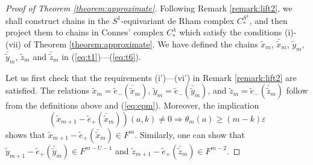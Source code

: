 \documentclass[a4paper]{article}
\numberwithin{equation}{section}
\begin{document}
\begin{proof}[Proof of Theorem \ref{theorem:approximate}]
Following Remark \ref{remark:lift2}, we shall construct chains in the $S^1$-equivariant de Rham complex $C_\ast^{S^1}$, and then project them to chains in Connes' complex $C_\ast^\lambda$ which satisfy the conditions (i)-(vii) of Theorem \ref{theorem:approximate}. We have defined the chains $\tilde{x}_m$, $\bar{\tilde{x}}_m$, $\tilde{y}_m$, $\bar{\tilde{y}}_m$, $\tilde{z}_m$ and $\bar{\tilde{z}}_m$ in (\ref{eq:t1})---(\ref{eq:t6}). 

Let us first check that the requirements (i')---(vi') in Remark \ref{remark:lift2} are satisfied. The relations $\tilde{x}_m=\tilde{e}_-(\bar{\tilde{x}}_m)$, $\tilde{y}_m=\tilde{e}_-(\bar{\tilde{y}}_m)$, and $\tilde{z}_m=\tilde{e}_-(\bar{\tilde{z}}_m)$ follow from the definitions above and (\ref{eq:epm}). Moreover, the implication
\begin{equation}
\left(\tilde{x}_{m+1}-\tilde{e}_+(\bar{\tilde{x}}_m)\right)(a,k)\neq0\Rightarrow\theta_m(a)\geq(m-k)\varepsilon
\end{equation}
shows that $\tilde{x}_{m+1}-\tilde{e}_+(\bar{\tilde{x}}_m)\in F^m$. Similarly, one can show that $\tilde{y}_{m+1}-\tilde{e}_+(\bar{\tilde{y}}_m)\in F^{m-U-1}$ and $\tilde{z}_{m+1}-\tilde{e}_+(\bar{\tilde{z}}_m)\in F^{m-2}$.


\end{proof}
\end{document}
